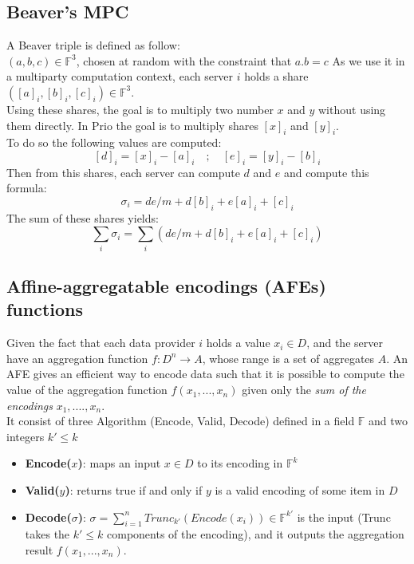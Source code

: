 \documentclass{article}
\begin{document}
\subsection*{Beaver's MPC}
A Beaver triple is defined as follow:\\
$(a,b,c) \in \mathbb{F}^3$, chosen at random with the constraint that $a . b = c$
As we use it in a multiparty computation context, each server $i$ holds a share $([a]_i , [b]_i , [c]_i) \in \mathbb{F}^3$.\\
Using these shares, the goal is to multiply two number $x$ and $y$ without using them directly. In Prio the goal is to multiply shares $[x]_i$ and $[y]_i$.\\
To do so the following values are computed:
$$[d]_i = [x]_i -[a]_i  \quad  ;  \quad  [e]_i = [y]_i - [b]_i$$ 
Then from this shares, each server can compute $d$ and $e$ and compute this formula:\\
$$\sigma_i = de/m + d[b]_i +e[a]_i + [c]_i$$
The sum of these shares yields: $$ \sum_{i} \sigma_i = \sum_{i}{(de/m +d[b]_i + e[a]_i + [c]_i)} $$

\subsection*{Affine-aggregatable encodings (AFEs) functions}
Given the fact that each data provider $i$ holds a value $x_i \in D$, and the server have an aggregation function $f : D^n \rightarrow A$, whose range is a set of aggregates $A$.
An AFE gives an efficient way to encode data such that it is possible to compute the value of the aggregation function $f(x_1,...,x_n)$ given only the \textit{sum of the encodings} $x_1,....,x_n$.\\
It consist of three Algorithm (Encode, Valid, Decode) defined in a field $\mathbb{F}$ and two integers $k' \leq k$\\
\begin{itemize}
\item \textbf{Encode($x$)}: maps an input $x \in D$ to its encoding in $\mathbb{F}^k$
\item \textbf{Valid($y$)}: returns true if and only if $y$ is a valid encoding of some item in $D$
\item \textbf{Decode($\sigma$)}: $\sigma = \sum_{i=1}^{n}{Trunc_{k'}(Encode(x_i))} \in \mathbb{F}^{k'}$ is the input (Trunc takes the $k' \leq k$ components of the encoding), and it outputs the aggregation result $f(x_1,...,x_n)$.
\end{itemize}
\end{document}
